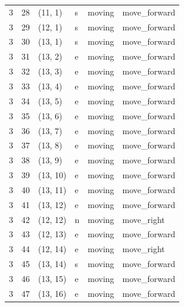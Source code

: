 \begin{table}[H]
\begin{tabular}{llllll}
3 & 28 & (11, 1) & s & moving & move\_forward \\
3 & 29 & (12, 1) & s & moving & move\_forward \\
3 & 30 & (13, 1) & s & moving & move\_forward \\
3 & 31 & (13, 2) & e & moving & move\_forward \\
3 & 32 & (13, 3) & e & moving & move\_forward \\
3 & 33 & (13, 4) & e & moving & move\_forward \\
3 & 34 & (13, 5) & e & moving & move\_forward \\
3 & 35 & (13, 6) & e & moving & move\_forward \\
3 & 36 & (13, 7) & e & moving & move\_forward \\
3 & 37 & (13, 8) & e & moving & move\_forward \\
3 & 38 & (13, 9) & e & moving & move\_forward \\
3 & 39 & (13, 10) & e & moving & move\_forward \\
3 & 40 & (13, 11) & e & moving & move\_forward \\
3 & 41 & (13, 12) & e & moving & move\_forward \\
3 & 42 & (12, 12) & n & moving & move\_right \\
3 & 43 & (12, 13) & e & moving & move\_forward \\
3 & 44 & (12, 14) & e & moving & move\_right \\
3 & 45 & (13, 14) & s & moving & move\_forward \\
3 & 46 & (13, 15) & e & moving & move\_forward \\
3 & 47 & (13, 16) & e & moving & move\_forward \\
    \bottomrule
  \end{tabular}
\end{table}

